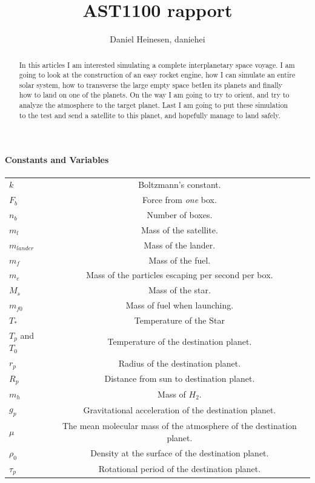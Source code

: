 \documentclass[a4paper, 10pt]{article}
\title{AST1100 rapport}
\author{Daniel Heinesen, daniehei}
\begin{document}
\maketitle

\begin{abstract}
In this articles I am interested simulating a complete interplanetary space voyage. I am going to look at the construction of an easy rocket engine, how I can simulate an entire solar system, how to transverse the large empty space betIen its planets and finally how to land on one of the planets. On the way I am going to try to orient, and try to analyze the atmosphere to the target planet. Last I am going to put these simulation to the test and send a satellite to this planet, and hopefully manage to land safely.
\end{abstract} 

\paragraph*{Constants and Variables}

\begin{center}
\begin{tabular}{l  c}
$k$ & Boltzmann's constant.\\
$F_b$ & Force from \textit{one} box. \\
$n_b$ & Number of boxes.\\
$m_l$ & Mass of the satellite. \\
$m_{lander}$ & Mass of the lander.\\
$m_f$ & Mass of the fuel.\\
$m_e$ & Mass of the particles escaping per second per box. \\
$M_s$ & Mass of the star.\\
$m_{f0}$ & Mass of fuel when launching. \\
$T_*$ & Temperature of the Star\\
$T_p$ and $T_0$ & Temperature of the destination planet. \\
$r_p$ & Radius of the destination planet. \\
$R_p$ & Distance from sun to destination planet. \\
$m_h$ & Mass of $H_2$.\\
$g_p$ & Gravitational acceleration of the destination planet. \\
$\mu$ & The mean molecular mass of the atmosphere of the destination planet.\\
$\rho_0$ & Density at the surface of the destination planet. \\
$\tau_p$ & Rotational period of the destination planet. \\
\end{tabular}
\end{center}
\end{document}
